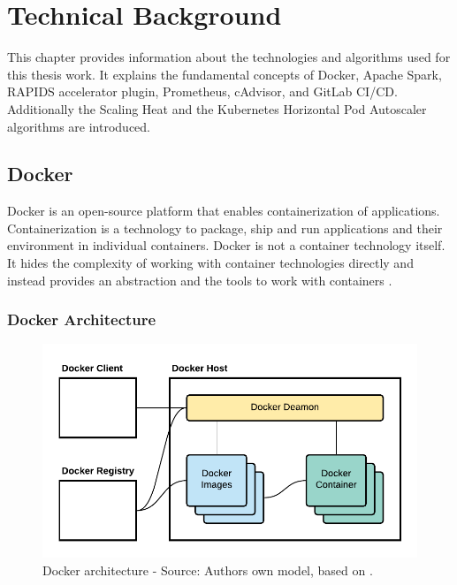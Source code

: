 \chapter{Technical Background}
\label{chap:04_background}

This chapter provides information about the technologies and algorithms used for this thesis work. It explains the fundamental concepts of Docker, Apache Spark, RAPIDS accelerator plugin, Prometheus, cAdvisor, and GitLab CI/CD. Additionally the Scaling Heat and the Kubernetes Horizontal Pod Autoscaler algorithms are introduced.

\section{Docker}
\label{sec:04_docker}
Docker is an open-source platform that enables containerization of applications. Containerization is a technology to package, ship and run applications and their environment in individual containers.
Docker is not a container technology itself. It hides the complexity of working with container technologies directly and instead provides an abstraction and the tools to work with containers \cite{Nickoloff2019Docker, Bullington2020Docker, Potdar2020Docker}.


\subsection{Docker Architecture}
\label{subsec:04_docker_architecture}
\begin{figure}[h]
\centering
\includegraphics[scale=1]{images/04_technical_background/docker/docker_architecture}
\caption{Docker architecture - Source: Authors own model, based on \cite{Docker2020Docs}.}
\label{fig:04_docker_architecture_architecture}
\end{figure}

